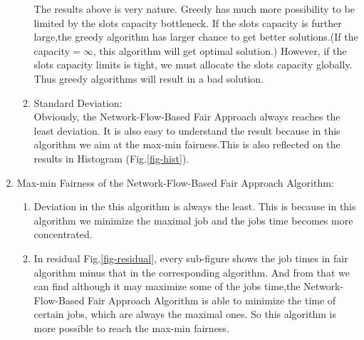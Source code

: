 \begin{enumerate}
\begin{enumerate}
        The results above is very nature. Greedy has much more possibility to be limited by the slots capacity bottleneck. If the slots capacity is further large,the greedy algorithm has larger chance to get better solutions.(If the capacity$=\infty$, this algorithm will get optimal solution.) However, if the slots capacity limits is tight, we must allocate the slots capacity globally. Thus greedy algorithms will result in a bad solution.
        \item Standard Deviation:\\
        Obviously, the Network-Flow-Based Fair Approach always reaches the least deviation. It is also easy to understand the result because in this algorithm we aim at the max-min fairness.This is also reflected on the results in Histogram (Fig.\ref{fig-hist}).
    \end{enumerate}
    \item Max-min Fairness of the Network-Flow-Based Fair Approach Algorithm:
    \begin{enumerate}
        \item Deviation in the this algorithm is always the least. This is because in this algorithm we minimize the maximal job and the jobs time becomes more concentrated.
        \item In residual Fig.\ref{fig-residual}, every sub-figure shows the job times in fair algorithm minus that in the corresponding algorithm. And from that we can find although it may maximize some of the jobs time,the Network-Flow-Based Fair Approach Algorithm is able to minimize the time of certain jobs, which are always the maximal ones. So this algorithm is more possible to reach the max-min fairness.
    \end{enumerate}
    
    
\end{enumerate}
